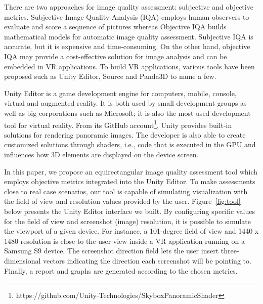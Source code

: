 \documentclass[10pt,conference,pdftex]{IEEEtran}
\begin{document}
There are two approaches for image quality assessment: subjective and objective metrics. Subjective Image Quality Analysis (IQA) employs human observers to evaluate and score a sequence of pictures whereas Objective IQA builds mathematical models for automatic image quality assessment. Subjective IQA is accurate, but it is expensive and time-consuming. On the other hand, objective IQA may provide a cost-effective solution for image analysis and can be embedded in VR applications. To build VR applications, various tools have been proposed such as Unity Editor, Source and Panda3D to name a few. \par

Unity Editor is a game development engine for computers, mobile, console, virtual and augmented reality. It is both used by small development groups as well as big corporations such as Microsoft; it is also the most used development tool for virtual reality. From its GitHub account\footnote{https://github.com/Unity-Technologies/SkyboxPanoramicShader}, Unity provides built-in solutions for rendering panoramic images. The developer is also able to create customized solutions through shaders, i.e., code that is executed in the GPU and influences how 3D elements are displayed on the device screen.

In this paper, we propose an equirectangular image quality assessment tool which employs objective metrics integrated into the Unity Editor. To make assessments close to real case scenarios, our tool is capable of simulating visualization with the field of view and resolution values provided by the user. Figure~\ref{fig:tool} below presents the Unity Editor interface we built. By configuring specific values for the field of view and screenshot (image) resolution, it is possible to simulate the viewport of a given device. For instance, a 101-degree field of view and 1440 x 1480 resolution is close to the user view inside a VR application running on a Samsung S9 device. The screenshot direction field lets the user insert three-dimensional vectors indicating the direction each screenshot will be pointing to. Finally, a report and graphs are generated according to the chosen metrics.
\end{document}

